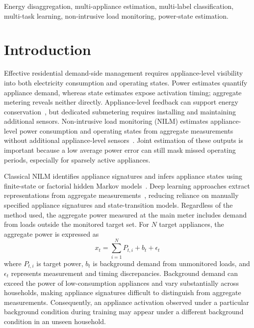 \documentclass[journal]{IEEEtran}
\begin{document}
\begin{IEEEkeywords}
Energy disaggregation, multi-appliance estimation, multi-label classification, multi-task learning, non-intrusive load monitoring, power-state estimation.
\end{IEEEkeywords}

\section{Introduction}

Effective residential demand-side management requires appliance-level visibility into both electricity consumption and operating states. Power estimates quantify appliance demand, whereas state estimates expose activation timing; aggregate metering reveals neither directly. Appliance-level feedback can support energy conservation~\cite{delmas2013information}, but dedicated submetering requires installing and maintaining additional sensors. Non-intrusive load monitoring (NILM) estimates appliance-level power consumption and operating states from aggregate measurements without additional appliance-level sensors~\cite{gopinath2020energy}. Joint estimation of these outputs is important because a low average power error can still mask missed operating periods, especially for sparsely active appliances.

Classical NILM identifies appliance signatures and infers appliance states using finite-state or factorial hidden Markov models~\cite{hart1992nilm,kolter2012fhmm}. Deep learning approaches extract representations from aggregate measurements~\cite{kelly2015neural}, reducing reliance on manually specified appliance signatures and state-transition models. Regardless of the method used, the aggregate power measured at the main meter includes demand from loads outside the monitored target set. For $N$ target appliances, the aggregate power is expressed as
\begin{equation}
x_t = \sum_{i=1}^{N} P_{t,i} + b_t + \epsilon_t
\label{eq:aggregate}
\end{equation}
where $P_{t,i}$ is target power, $b_t$ is background demand from unmonitored loads, and $\epsilon_t$ represents measurement and timing discrepancies. Background demand can exceed the power of low-consumption appliances and vary substantially across households, making appliance signatures difficult to distinguish from aggregate measurements. Consequently, an appliance activation observed under a particular background condition during training may appear under a different background condition in an unseen household.
\end{document}
